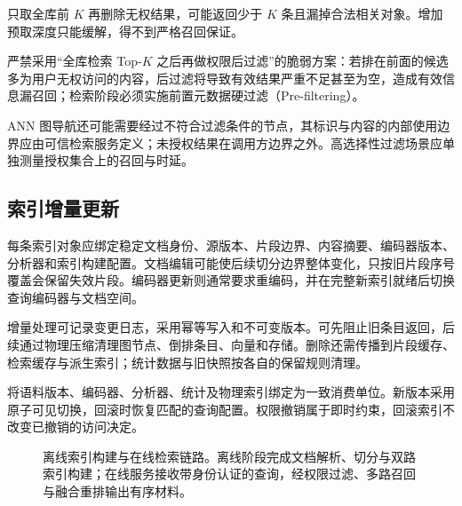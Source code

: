 \documentclass[../textbook.tex]{subfiles}
\begin{document}
只取全库前 $K$ 再删除无权结果，可能返回少于 $K$ 条且漏掉合法相关对象。增加预取深度只能缓解，得不到严格召回保证。

\begin{warning}[后置权限过滤的召回与安全缺陷]
严禁采用“全库检索 Top-$K$ 之后再做权限后过滤”的脆弱方案：若排在前面的候选多为用户无权访问的内容，后过滤将导致有效结果严重不足甚至为空，造成有效信息漏召回；检索阶段必须实施前置元数据硬过滤（Pre-filtering）。
\end{warning}ANN 图导航还可能需要经过不符合过滤条件的节点，其标识与内容的内部使用边界应由可信检索服务定义；未授权结果在调用方边界之外。高选择性过滤场景应单独测量授权集合上的召回与时延。

\subsection{索引增量更新}
每条索引对象应绑定稳定文档身份、源版本、片段边界、内容摘要、编码器版本、分析器和索引构建配置。文档编辑可能使后续切分边界整体变化，只按旧片段序号覆盖会保留失效片段。编码器更新则通常要求重编码，并在完整新索引就绪后切换查询编码器与文档空间。

增量处理可记录变更日志，采用幂等写入和不可变版本。可先阻止旧条目返回，后续通过物理压缩清理图节点、倒排条目、向量和存储。删除还需传播到片段缓存、检索缓存与派生索引；统计数据与旧快照按各自的保留规则清理。

将语料版本、编码器、分析器、统计及物理索引绑定为一致消费单位。新版本采用原子可见切换，回滚时恢复匹配的查询配置。权限撤销属于即时约束，回滚索引不改变已撤销的访问决定。

\begin{figure}[htbp]
\centering
{}
\caption[离线索引构建与在线检索链路]{离线索引构建与在线检索链路。离线阶段完成文档解析、切分与双路索引构建；在线服务接收带身份认证的查询，经权限过滤、多路召回与融合重排输出有序材料。}\label{fig:ir-pipeline}
\end{figure}
\end{document}
